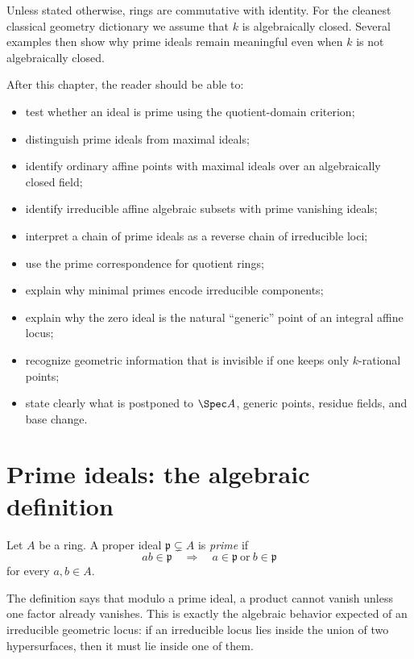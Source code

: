 Unless stated otherwise, rings are commutative with identity.  For the cleanest classical
geometry dictionary we assume that \(k\) is algebraically closed.  Several examples then
show why prime ideals remain meaningful even when \(k\) is not algebraically closed.

After this chapter, the reader should be able to:
\begin{itemize}
  \item test whether an ideal is prime using the quotient-domain criterion;
  \item distinguish prime ideals from maximal ideals;
  \item identify ordinary affine points with maximal ideals over an algebraically closed field;
  \item identify irreducible affine algebraic subsets with prime vanishing ideals;
  \item interpret a chain of prime ideals as a reverse chain of irreducible loci;
  \item use the prime correspondence for quotient rings;
  \item explain why minimal primes encode irreducible components;
  \item explain why the zero ideal is the natural ``generic'' point of an integral affine locus;
  \item recognize geometric information that is invisible if one keeps only \(k\)-rational points;
  \item state clearly what is postponed to \(\Spec A\), generic points, residue fields, and base change.
\end{itemize}



\section{Prime ideals: the algebraic definition}

\begin{definition}
Let \(A\) be a ring.  A proper ideal \(\mathfrak p\subsetneq A\) is \emph{prime} if
\[
ab\in\mathfrak p
\quad\Longrightarrow\quad
 a\in\mathfrak p\ \text{or}\ b\in\mathfrak p
\]
for every \(a,b\in A\).
\end{definition}

The definition says that modulo a prime ideal, a product cannot vanish unless one factor
already vanishes.  This is exactly the algebraic behavior expected of an irreducible
geometric locus: if an irreducible locus lies inside the union of two hypersurfaces, then it
must lie inside one of them.

